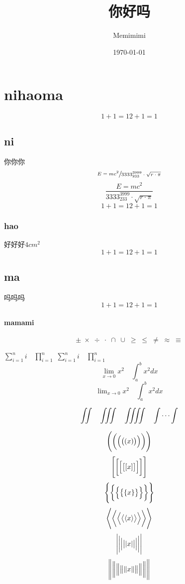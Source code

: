 \documentclass[UTF8]{ctexart}
\title{你好吗}
\author{Memimimi}
\date{\today}
\begin{document}
\maketitle
\tableofcontents
\section{nihaoma}
\begin{equation}
1+1=1
2+1=1
\end{equation}
\subsection{ni}
你你你
\[
\sfrac{E=mc^2}
{{3333}^{3999}_{233}\cdot\sqrt{r\cdot\pi}}
\]
\[
\frac{E=mc^2}
{{3333}^{3999}_{233}\cdot\sqrt{r\cdot\pi}}
\]
\begin{equation}
1+1=1
2+1=1
\end{equation}
\subsubsection{hao}
好好好$4cm^2$
\begin{equation}
1+1=1
2+1=1
\end{equation}
\subsection{ma}
吗吗吗
\begin{equation}
1+1=1
2+1=1
\end{equation}
\paragraph{mamami}
\[ \pm\; \times \; \div\; \cdot\; \cap\; \cup\;
\geq\; \leq\; \neq\; \approx \; \equiv \]

$ \sum_{i=1}^n i\quad \prod_{i=1}^n $
$ \sum\limits _{i=1}^n i\quad \prod\limits _{i=1}^n $
\[ \lim_{x\to0}x^2 \quad \int_a^b x^2 dx \]
\[ \lim\nolimits _{x\to0}x^2\quad \int\nolimits_a^b x^2 dx \]

\[ \iint\quad \iiint\quad \iiiint\quad \idotsint \]

\[ \Biggl(\biggl(\Bigl(\bigl((x)\bigr)\Bigr)\biggr)\Biggr) \]
\[ \Biggl[\biggl[\Bigl[\bigl[[x]\bigr]\Bigr]\biggr]\Biggr] \]
\[ \Biggl \{\biggl \{\Bigl \{\bigl \{\{x\}\bigr \}\Bigr \}\biggr \}\Biggr\} \]
\[ \Biggl\langle\biggl\langle\Bigl\langle\bigl\langle\langle x
\rangle\bigr\rangle\Bigr\rangle\biggr\rangle\Biggr\rangle \]
\[ \Biggl\lvert\biggl\lvert\Bigl\lvert\bigl\lvert\lvert x
\rvert\bigr\rvert\Bigr\rvert\biggr\rvert\Biggr\rvert \]
\[ \Biggl\lVert\biggl\lVert\Bigl\lVert\bigl\lVert\lVert x
\rVert\bigr\rVert\Bigr\rVert\biggr\rVert\Biggr\rVert \]
\end{document}
